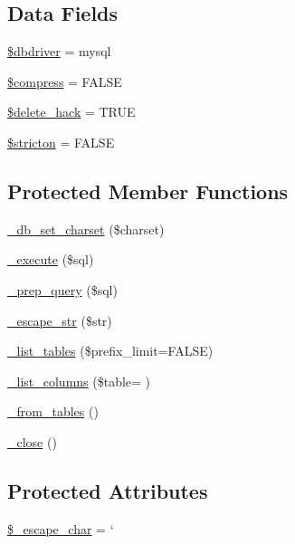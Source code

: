 \subsection*{Data Fields}
\begin{DoxyCompactItemize}
\item 
\hyperlink{class_c_i___d_b__mysql__driver_a0cde2a16322a023d040aa7f725877597}{\$dbdriver} = \textquotesingle{}mysql\textquotesingle{}
\item 
\hyperlink{class_c_i___d_b__mysql__driver_abf799de0d30288b91ee73769281dd69d}{\$compress} = F\+A\+L\+S\+E
\item 
\hyperlink{class_c_i___d_b__mysql__driver_ad60008f32a478e978c7c3284f320f273}{\$delete\+\_\+hack} = T\+R\+U\+E
\item 
\hyperlink{class_c_i___d_b__mysql__driver_afb42d9811bec1da94506e5764e1439e0}{\$stricton} = F\+A\+L\+S\+E
\end{DoxyCompactItemize}
\subsection*{Protected Member Functions}
\begin{DoxyCompactItemize}
\item 
\hyperlink{class_c_i___d_b__mysql__driver_a2b808d420d8e9fea0b73ad7127f5efb8}{\+\_\+db\+\_\+set\+\_\+charset} (\$charset)
\item 
\hyperlink{class_c_i___d_b__mysql__driver_a114ab675d89bf8324a41785fb475e86d}{\+\_\+execute} (\$sql)
\item 
\hyperlink{class_c_i___d_b__mysql__driver_a86af88ef0fa6d44ab4691e3f53270339}{\+\_\+prep\+\_\+query} (\$sql)
\item 
\hyperlink{class_c_i___d_b__mysql__driver_af8ef0237bfcdb19215b63fff769e7a55}{\+\_\+escape\+\_\+str} (\$str)
\item 
\hyperlink{class_c_i___d_b__mysql__driver_a435c0f3ce54fe7daa178baa8532ebd54}{\+\_\+list\+\_\+tables} (\$prefix\+\_\+limit=F\+A\+L\+S\+E)
\item 
\hyperlink{class_c_i___d_b__mysql__driver_a2a81bb476a5c76fe6f763b0557c1e4c2}{\+\_\+list\+\_\+columns} (\$table= \textquotesingle{}\textquotesingle{})
\item 
\hyperlink{class_c_i___d_b__mysql__driver_aef43f7e3e7b71d337ff3724c5eb14f10}{\+\_\+from\+\_\+tables} ()
\item 
\hyperlink{class_c_i___d_b__mysql__driver_a4d9082658000e5ede8312067c6dda9db}{\+\_\+close} ()
\end{DoxyCompactItemize}
\subsection*{Protected Attributes}
\begin{DoxyCompactItemize}
\item 
\hyperlink{class_c_i___d_b__mysql__driver_aaec2fb0112850159063a8e47ad3aed6e}{\$\+\_\+escape\+\_\+char} = \textquotesingle{}`\textquotesingle{}
\end{DoxyCompactItemize}


